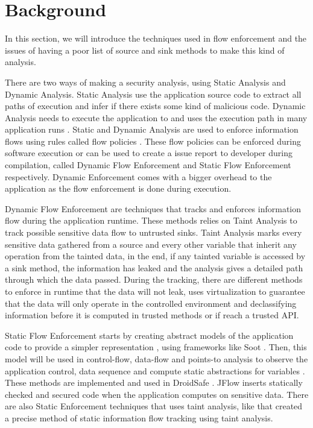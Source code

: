 \chapter{Background}\label{chapter:background}

In this section, we will introduce the techniques used in flow enforcement and the issues of having a poor list of source and sink methods to make this kind of analysis.

There are two ways of making a security analysis, using Static Analysis and Dynamic Analysis. Static Analysis use the application source code to extract all paths of execution and infer if there exists some kind of malicious code. Dynamic Analysis needs to execute the application to and uses the execution path in many application runs \citep{tam2017evolution}. Static and Dynamic Analysis are used to enforce information flows using rules called flow policies \citep{fernandes2016flowfence}. These flow policies can be enforced during software execution or can be used to create a issue report to developer during compilation, called Dynamic Flow Enforcement and Static Flow Enforcement respectively. Dynamic Enforcement comes with a bigger overhead to the application as the flow enforcement is done during execution.

Dynamic Flow Enforcement are techniques that tracks and enforces information flow during the application runtime. These methods relies on Taint Analysis to track possible sensitive data flow to untrusted sinks. Taint Analysis marks every sensitive data gathered from a source and every other variable that inherit any operation from the tainted data, in the end, if any tainted variable is accessed by a sink method, the information has leaked and the analysis gives a detailed path through which the data passed. During the tracking, there are different methods to enforce in runtime that the data will not leak, \cite{fernandes2016flowfence} uses virtualization to guarantee that the data will only operate in the controlled environment and \cite{sun2017data} declassifying information before it is computed in trusted methods or if reach a trusted API.

Static Flow Enforcement starts by creating abstract models of the application code to provide a simpler representation \citep{myers1999jflow}, using frameworks like Soot \citep{vallee2000optimizing}. Then, this model will be used in control-flow, data-flow and points-to analysis to observe the application control, data sequence and compute static abstractions for variables \cite{li2017static}. These methods are implemented and used in DroidSafe \cite{gordon2015information}. JFlow \cite{myers1999jflow} inserts statically checked and secured code when the application computes on sensitive data. There are also Static Enforcement techniques that uses taint analysis, like \cite{arzt2014flowdroid} that created a precise method of static information flow tracking using taint analysis.

